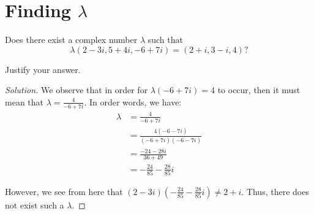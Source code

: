 \documentclass{article}
\newenvironment{solution}{\begin{proof}[Solution]}{\end{proof}}
\begin{document}
\section{Finding $\lambda$}
\begin{hw}
	Does there exist a complex number $\lambda$ such that
	\begin{equation*}
		\lambda(2-3i, 5+4i, -6+7i) = (2+i, 3-i, 4)?
	\end{equation*}

	Justify your answer.
\end{hw}
\begin{solution}
\begin{comment}
We want to find some complex number $\lambda = a + bi$ such that the following holds:
\begin{align*}
	(a + bi)(2-3i) &= 2+i \\
	(a+bi)(5+4i) &= 3-i \\
	(a+bi)(-6+7i) &= 4
\end{align*}

With this in mind, we have the following:
\begin{align*}
	(2a + 3b) + (-3a + 2b)i &= 2+i \\
	(5a - 4b) + (4a + 5b)i &= 3 - i \\
	(-6a - 7b) + (7a - 6b)i &= 4 + 0i \\
\end{align*}

From here, we can see from the last line that $(7a - 6b)i = 0i \implies 7a - 6b = 0 \implies 7a = 6b$. Then, we have that $a = \frac{6}{7}b$.

Through substituting, we get $-\frac{36}{7}b - \frac{49}{7}b = 4$. So, we get $-\frac{85}{7}b = 4$, we $b = -\frac{28}{85}$.

Then, we must have that $a = -\frac{4(7)}{85}\frac{6}{7} = -\frac{24}{85}$.

However, when checking if these solutions work with the first line, we see that $2a + 3b = -\frac{132}{85} \not= 2$.
\end{comment}
We observe that in order for $\lambda(-6 + 7i) = 4$ to occur, then it must mean that $\lambda = \frac{4}{-6 + 7i}$. In order words, we have:
\begin{align*}
	\lambda &= \frac{4}{-6 + 7i} \\
	&= \frac{4(-6-7i)}{(-6+7i)(-6-7i)} \\
	&= \frac{-24 - 28i}{36 + 49} \\
	&= -\frac{24}{85} -\frac{28}{85}i
\end{align*}

However, we see from here that $(2-3i)(-\frac{24}{85} - \frac{28}{85}i) \not= 2 + i$. Thus, there does not exist such a $\lambda$.
\end{solution}
\end{document}
